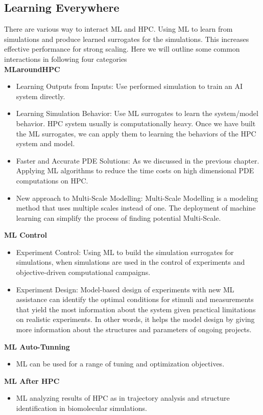 \documentclass[conference]{IEEEtran}
\begin{document}
\subsection{Learning Everywhere}
There are various way to interact ML and HPC. Using ML to learn from simulations and produce learned surrogates for the simulations. This increases effective performance for strong scaling. 
Here we will outline some common interactions in following four categories\\
\textbf{MLaroundHPC}
\begin{itemize}
\item Learning Outputs from Inputs: Use performed simulation to train an AI system directly\cite{b20,b21}.
\item Learning Simulation Behavior: Use ML surrogates to learn the system/model behavior. HPC system usually is computationally heavy. Once we have built the ML surrogates, we can apply them to learning the behaviors of the HPC system and model\cite{b22,b23}.
\item Faster and Accurate PDE Solutions: As we discussed in the previous chapter. Applying ML algorithms to reduce the time costs on high dimensional PDE computations on HPC\cite{b23,b24,b25,b26}.
\item New approach to Multi-Scale Modelling: Multi-Scale Modelling is a modeling method that uses multiple scales instead of one. The deployment of machine learning can simplify the process of finding potential Multi-Scale.\cite{b27,b28,b29,b30,b31}
\end{itemize}
\textbf{ML Control}
\begin{itemize}
\item Experiment Control: Using ML to build the simulation surrogates for simulations, when simulations are used in the control of experiments and objective-driven computational campaigns\cite{b33,b34,b35,b36,b37,b38}.
\item Experiment Design: Model-based design of experiments with new ML assistance can identify the optimal conditions for stimuli and measurements that yield the most information about the system given practical limitations on realistic experiments. In other words, it helps the model design by giving more information about the structures and parameters of ongoing projects\cite{b39}.
\end{itemize}
\textbf{ML Auto-Tunning}
\begin{itemize}
\item ML can be used for a range of tuning and optimization objectives\cite{b40,b41,b42,b43}.
\end{itemize}
\textbf{ML After HPC}
\begin{itemize}
\item ML analyzing results of HPC as in trajectory analysis and structure identification in biomolecular simulations\cite{b44}.
\end{itemize}
\end{document}
